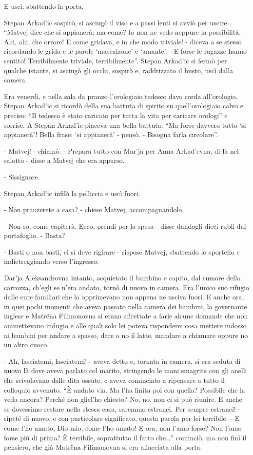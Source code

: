 E uscì, sbattendo la porta. 

Stepan Arkad'ic sospirò, si asciugò il viso e a passi lenti si avviò per uscire. ``Matvej dice che si appianerà; ma come? Io non ne vedo neppure la possibilità. Ahi, ahi, che orrore! E come gridava, e in che modo triviale! - diceva a se stesso ricordando le grida e le parole `mascalzone' e `amante'. - E forse le ragazze hanno sentito! Terribilmente triviale, terribilmente''. Stepan Arkad'ic si fermò per qualche istante, si asciugò gli occhi, sospirò e, raddrizzato il busto, uscì dalla camera. 

Era venerdì, e nella sala da pranzo l'orologiaio tedesco dava corda all'orologio. Stepan Arkad'ic si ricordò della sua battuta di spirito su quell'orologiaio calvo e preciso: ``Il tedesco è stato caricato per tutta la vita per caricare orologi'' e sorrise. A Stepan Arkad'ic piaceva una bella battuta. ``Ma forse davvero tutto `si appianerà'! Bella frase: `si appianerà' - pensò. - Bisogna farla circolare''. 

- Matvej! - chiamò. - Prepara tutto con Mar'ja per Anna Arkad'evna, di là nel salotto - disse a Matvej che era apparso. 

- Sissignore. 

Stepan Arkad'ic infilò la pelliccia e uscì fuori. 

- Non pranzerete a casa? - chiese Matvej, accompagnandolo. 

- Non so, come capiterà. Ecco, prendi per la spesa - disse dandogli dieci rubli dal portafoglio. - Basta? 

- Basti o non basti, ci si deve rigirare - rispose Matvej, sbattendo lo sportello e indietreggiando verso l'ingresso. 

Dar'ja Aleksandrovna intanto, acquietato il bambino e capito, dal rumore della carrozza, ch'egli se n'era andato, tornò di nuovo in camera. Era l'unico suo rifugio dalle cure familiari che la opprimevano non appena ne usciva fuori. E anche ora, in quei pochi momenti che aveva passato nella camera dei bambini, la governante inglese e Matrëna Filimonovna si erano affrettate a farle alcune domande che non ammettevano indugio e alle quali solo lei poteva rispondere: cosa mettere indosso ai bambini per andare a spasso, dare o no il latte, mandare a chiamare oppure no un altro cuoco. 

- Ah, lasciatemi, lasciatemi! - aveva detto e, tornata in camera, si era seduta di nuovo là dove aveva parlato col marito, stringendo le mani smagrite con gli anelli che scivolavano dalle dita ossute, e aveva cominciato a ripensare a tutto il colloquio avvenuto. ``È andato via. Ma l'ha finita poi con quella? Possibile che la veda ancora? Perché non gliel'ho chiesto? No, no, non ci si può riunire. E anche se dovessimo restare nella stessa casa, saremmo estranei. Per sempre estranei! - ripeté di nuovo, e con particolare significato, questa parola per lei terribile. - E come l'ho amato, Dio mio, come l'ho amato! E ora, non l'amo forse? Non l'amo forse più di prima? È terribile, soprattutto il fatto che\ldots{}'' cominciò, ma non finì il pensiero, che già Matrëna Filimonovna si era affacciata alla porta. 

